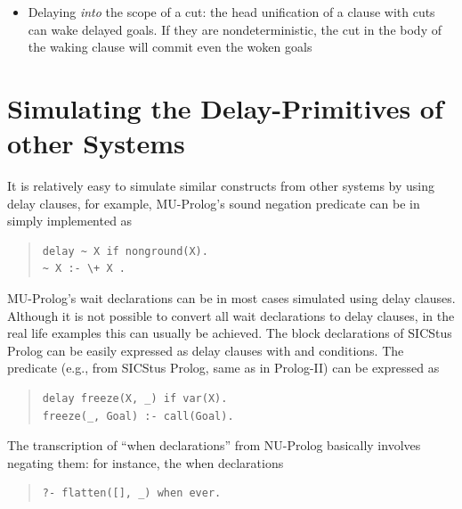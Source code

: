 {\begin{itemize}
\item Delaying \emph{into} the scope of a cut:
the head unification of a clause with cuts can wake delayed goals.
If they are nondeterministic, the cut in the body of the waking clause
will commit even the woken goals
\end{itemize}




\section{Simulating the Delay-Primitives of other Systems}
It is relatively easy to simulate similar constructs from other
systems by using delay clauses,
for example, MU-Prolog's sound negation predicate 
can be in {\eclipse} simply implemented as
\begin{quote}
\begin{verbatim}
delay ~ X if nonground(X).
~ X :- \+ X .
\end{verbatim}
\end{quote}
MU-Prolog's wait declarations can be in most cases
simulated using delay clauses.
Although it is not possible to convert all wait declarations
to delay clauses, in the real life examples
this can usually be achieved.
The block declarations of SICStus Prolog can be easily expressed
as delay clauses with  and
 conditions.
The  predicate (e.g., from SICStus Prolog, same as
 in Prolog-II) can be expressed as
\begin{quote}
\begin{verbatim}
delay freeze(X, _) if var(X).
freeze(_, Goal) :- call(Goal).
\end{verbatim}
\end{quote}
The transcription of ``when declarations'' from NU-Prolog
basically involves negating them:
for instance, the when declarations
\begin{quote}
\begin{verbatim}
?- flatten([], _) when ever.

\end{verbatim}
\end{quote}}
